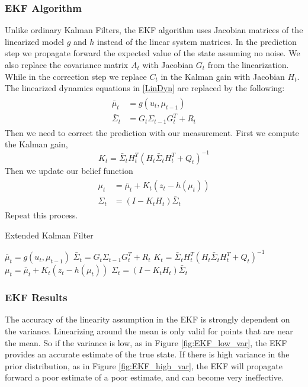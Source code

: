 \documentclass[twoside]{article}
\begin{document}
\subsubsection{EKF Algorithm}
Unlike ordinary Kalman Filters, the EKF algorithm uses Jacobian matrices of the linearized model $g$ and $h$ instead of the linear system matrices. 
In the prediction step we propagate forward the expected value of the state assuming no noise. We also replace the covariance matrix $A_t$ with Jacobian $G_t$ from the linearization. While in the correction step we replace $C_t$ in the Kalman gain with Jacobian $H_t$. The linearized dynamics equations in \eqref{LinDyn} are replaced by the following:
\begin{align}
\begin{split}
\bar{\mu}_t &= g(u_t,\mu_{t-1})
\\\bar{\Sigma}_t &= G_t\Sigma_{t-1} G_t^{T} + R_t
\end{split}
\end{align}
Then we need to correct the prediction with our measurement. First we compute the Kalman gain,
\begin{equation}
K_t = \bar{\Sigma}_{t}H_t^{T}(H_t\bar{\Sigma}_{t}H_t^{T}+Q_t)^{-1}
\end{equation}
Then we update our belief function 
\begin{align}
\begin{split}
\mu_t &= \bar{\mu}_t+K_t(z_t-h(\mu_{t})) \\
\Sigma_t &= (I-K_t H_t)\bar{\Sigma}_t
\end{split}
\end{align}
Repeat this process.

\begin{algorithm}[H]
\caption{Extended Kalman Filter}
	$	\bar{\mu}_t = g(u_t,\mu_{t-1})$\;
	$	\bar{\Sigma}_t = G_t\Sigma_{t-1} G_t^{T} + R_t$\;	
	$ 	K_t = \bar{\Sigma}_{t}H_t^{T}(H_t\bar{\Sigma}_{t}H_t^{T}+Q_t)^{-1}$\;	
	$    \mu_t = \bar{\mu}_t+K_t(z_t-h(\mu_{t}))$\;	
	$   \Sigma_t = (I-K_t H_t)\bar{\Sigma}_t$\;
\end{algorithm}

\subsubsection{EKF Results}
The accuracy of the linearity assumption in the EKF is strongly dependent on the variance. Linearizing around the mean is only valid for points that are near the mean. So if the variance is low, as in Figure \ref{fig:EKF_low_var}, the EKF provides an accurate estimate of the true state. If there is high variance in the prior distribution, as in Figure \ref{fig:EKF_high_var}, the EKF will propagate forward a poor estimate of a poor estimate, and can become very ineffective. 
\end{document}
